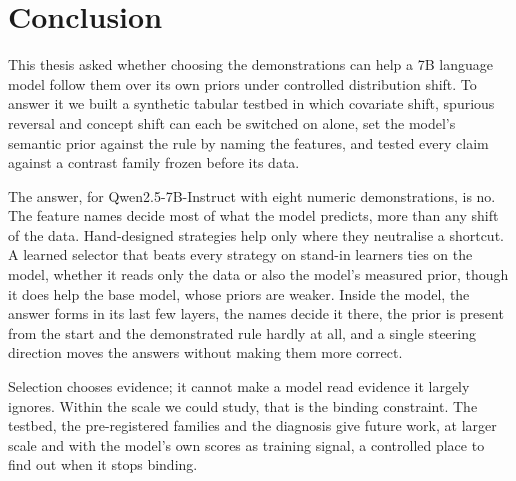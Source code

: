 \chapter{Conclusion}
\label{ch:conclusion}

This thesis asked whether choosing the demonstrations can help a 7B language model follow them over its own priors under controlled distribution shift.
To answer it we built a synthetic tabular testbed in which covariate shift, spurious reversal and concept shift can each be switched on alone, set the model's semantic prior against the rule by naming the features, and tested every claim against a contrast family frozen before its data.

The answer, for Qwen2.5-7B-Instruct with eight numeric demonstrations, is no.
The feature names decide most of what the model predicts, more than any shift of the data.
Hand-designed strategies help only where they neutralise a shortcut.
A learned selector that beats every strategy on stand-in learners ties on the model, whether it reads only the data or also the model's measured prior, though it does help the base model, whose priors are weaker.
Inside the model, the answer forms in its last few layers, the names decide it there, the prior is present from the start and the demonstrated rule hardly at all, and a single steering direction moves the answers without making them more correct.

Selection chooses evidence; it cannot make a model read evidence it largely ignores.
Within the scale we could study, that is the binding constraint.
The testbed, the pre-registered families and the diagnosis give future work, at larger scale and with the model's own scores as training signal, a controlled place to find out when it stops binding.
